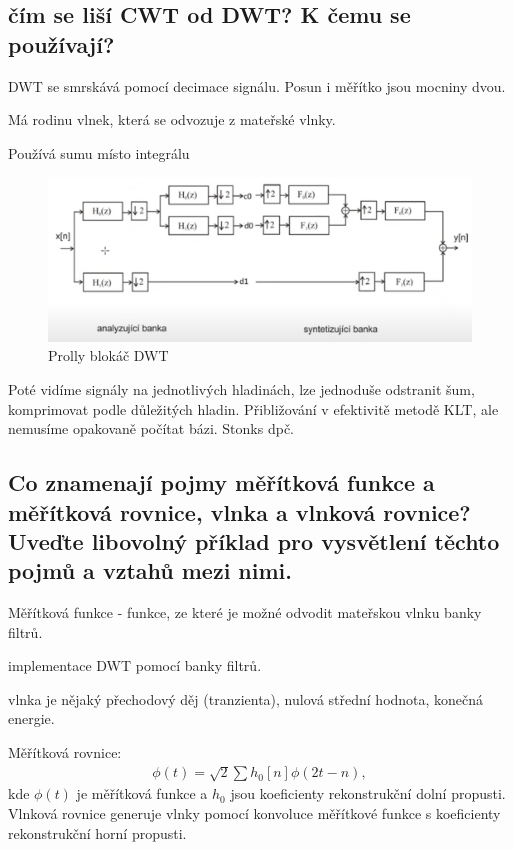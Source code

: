 \documentclass[a4paper,12pt]{article}   %
\newcommand{\mt}[1]{$#1$}
\begin{document}
\subsection{čím se liší CWT od DWT? K čemu se používají?}
DWT se smrskává pomocí decimace signálu. Posun i měřítko jsou mocniny dvou.

Má rodinu vlnek, která se odvozuje z mateřské vlnky.

Používá sumu místo integrálu

\begin{figure}
        \centering
        \includegraphics[width=.8\textwidth]{fig/DWT_blokac.png}
        \caption*{Prolly blokáč DWT}
\end{figure}

Poté vidíme signály na jednotlivých hladinách, lze jednoduše odstranit šum, komprimovat podle důležitých hladin. Přibližování v efektivitě metodě KLT, ale nemusíme opakovaně počítat bázi. Stonks dpč. 


\subsection{Co znamenají pojmy měřítková funkce a měřítková rovnice, vlnka a vlnková rovnice? Uveďte libovolný příklad pro vysvětlení těchto pojmů a vztahů mezi nimi.}
Měřítková funkce - funkce, ze které je možné odvodit mateřskou vlnku banky filtrů. 

implementace DWT pomocí banky filtrů.

vlnka je nějaký přechodový děj (tranzienta), nulová střední hodnota, konečná energie.

Měřítková rovnice:
\begin{align*}
        \phi(t) = \sqrt{2} \sum h_0[n]\phi(2t-n),
\end{align*}
kde \mt{\phi (t)} je měřítková funkce a \mt{h_0} jsou koeficienty rekonstrukční dolní propusti. Vlnková rovnice generuje vlnky pomocí konvoluce měřítkové funkce s koeficienty rekonstrukční horní propusti. 


\end{document}
